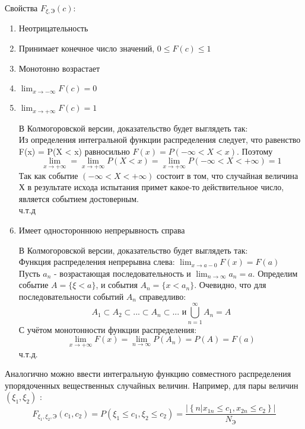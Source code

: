Свойства $ F_{\xi, \text{Э}} \left(c\right) $:
\begin{enumerate}
    \item Неотрицательность
    \item Принимает конечное число значений, $ 0 \leqslant F \left(c\right) \leqslant 1 $
    \item Монотонно возрастает
    \item $ \lim_{x\to -\infty} F \left(c\right) = 0 $
    \item $ \lim_{x\to +\infty} F \left(c\right) = 1 $

    В Колмогоровской версии, доказательство будет выглядеть так:\\
    Из определения интегральной функции распределения следует, что равенство F(x) = P(X < x) равносильно $F(x) = P(-\infty < X < x)$. Поэтому 
    \[\lim_{x \rightarrow + \infty} = \lim_{x \rightarrow + \infty} P(X < x) = \lim_{x \rightarrow + \infty} P(-\infty < X < + \infty) = 1 \]
    Так как событие $(-\infty < X < +\infty)$ состоит в том, что случайная величина Х в результате исхода испытания примет какое-то действительное число, является событием достоверным.\\
    ч.т.д

\newpage

    \item Имеет одностороннюю непрерывность справа

    В Колмогоровской версии, доказательство будет выглядеть так:\\
    Функция распределения непрерывна слева: $\lim_{x \rightarrow a - 0} F (x) = F (a) $\\
    Пусть $a_n$ - возрастающая последовательность и $\lim_{n \rightarrow \infty} a_n = a$. Определим событие $A = \{\xi < a\}$, и события $A_n = \{x < a_n\}$. Очевидно, что для последовательности событий $A_n$ справедливо:
    \[A_1 \subset A_2 \subset ... \subset A_n \subset ... \text{ и} \bigcup_{n=1}^\infty A_n = A\]
    С учётом монотонности функции распределения:
    \[\lim_{x \rightarrow +\infty} F (x) = \lim_{n \rightarrow \infty} P(A_n) = P(A) = F (a)\]
    ч.т.д.\\

\end{enumerate}

{}
Аналогично можно ввести интегральную функцию совместного распределения упорядоченных вещественных случайных
величин. Например, для пары величин $ \left(\xi_1, \xi_2\right) $ : \\ [0.2cm]
\[
F_{\xi_1, \xi_2, \text{Э}} \left(c_1, c_2\right) = P \left(\xi_1 \leqslant c_1, \xi_2 \leqslant c_2\right) =
\frac{|\left\{ n | x_{1n} \leqslant c_1, x_{2n} \leqslant c_2 \right\}|}{N_{\text{Э}}}
\]
